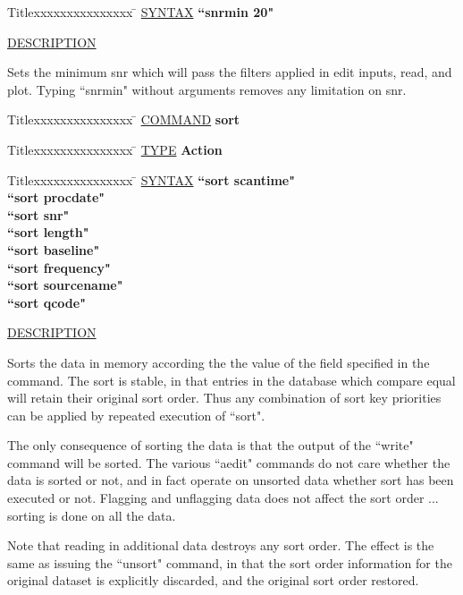 \begin{tabbing}
Titlexxxxxxxxxxxxxxx \= \kill
\underline{SYNTAX} \> {\bf 		``snrmin 20"} \\
\end{tabbing}

\underline{DESCRIPTION}
\begin{list}{}{\setlength{\leftmargin}{0.5in}
     \setlength{\rightmargin}{0in}}
\item
Sets the minimum snr which will pass the filters applied
in edit inputs, read, and plot.  Typing ``snrmin" without
arguments removes any limitation on snr.
\end{list}
\vspace{.2in}

\begin{tabbing}
Titlexxxxxxxxxxxxxxx \= \kill
\underline{COMMAND} \> {\bf 	sort} \\
\end{tabbing}

\begin{tabbing}
Titlexxxxxxxxxxxxxxx \= \kill
\underline{TYPE} \> {\bf 		Action} \\
\end{tabbing}

\begin{tabbing}
Titlexxxxxxxxxxxxxxx \= \kill
\underline{SYNTAX} \> {\bf 		``sort scantime"} \\
\> {\bf 		``sort procdate"} \\
\> {\bf 		``sort snr"} \\
\> {\bf 		``sort length"} \\
\> {\bf 		``sort baseline"} \\
\> {\bf 		``sort frequency"} \\
\> {\bf 		``sort sourcename"} \\
\> {\bf 		``sort qcode"} \\
\end{tabbing}

\underline{DESCRIPTION}
\begin{list}{}{\setlength{\leftmargin}{0.5in}
     \setlength{\rightmargin}{0in}}
\item
Sorts the data in memory according the the value of the
field specified in the command.  The sort is stable, in that
entries in the database which compare equal will retain
their original sort order.  Thus any combination of sort
key priorities can be applied by repeated execution of ``sort".
\item
The only consequence of sorting the data is that the output
of the ``write" command will be sorted.  The various ``aedit"
commands do not care whether the data is sorted or not, and in
fact operate on unsorted data whether sort has been executed or
not.  Flagging and unflagging data does not affect the sort
order ... sorting is done on all the data.
\item
Note that reading in additional data destroys any sort order.  The
effect is the same as issuing the ``unsort" command, in that
the sort order information for the original dataset is explicitly
discarded, and the original sort order restored.
\end{list}
\vspace{.2in}

